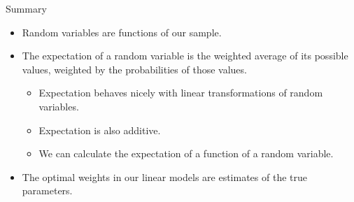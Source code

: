 \documentclass[aspectratio=169]{../latex_main/tntbeamer}  %
\begin{document}
	
	\begin{frame}[c]{Summary}
	   \begin{itemize}
	       \item Random variables are functions of our sample.
	       \item The expectation of a random variable is the weighted average of its possible values, weighted by the probabilities of those values.
	       \begin{itemize}
	           \item Expectation behaves nicely with linear transformations of random variables.
	           \item Expectation is also additive.
	           \item We can calculate the expectation of a function of a random variable.
	       \end{itemize}
	       \item The optimal weights in our linear models are estimates of the true parameters.
	   \end{itemize}
	\end{frame}
\end{document}
